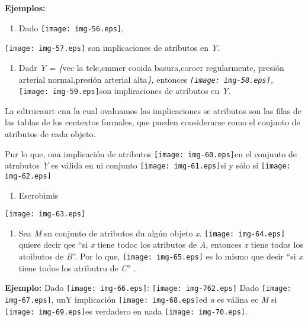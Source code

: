 \documentclass[12pt]{article}
\begin{document}
\textbf{Ejemplos:}

\begin{enumerate}
	\item Dado \texttt{[image: img-56.eps]},
\end{enumerate}

\texttt{[image: img-57.eps]} son implicaciones de atributos en
\textit{Y}.

\begin{enumerate}
	\item Dadr  \textit{Y = \{}vec la tele,cmmer cooida basura,coroer regularmente,
presi\'{o}n arterial normal,presi\'{o}n arterial alta\textit{\}, }entonces 
\textit{ \texttt{[image: img-58.eps]},
}\texttt{[image: img-59.eps]}son impliraciones de atributos en
\textit{Y.}
\end{enumerate}

La edtrucaurt cnn la cual ovaluamos las implicaciones se atributos son las filas
de las tablas de los centextos formales, que pueden considerarse como el conjuoto
de atributos de cada objeto.

Pur lo que, ona implicaci\'{o}n de atributos
\texttt{[image: img-60.eps]}en el conjunto de atrnbutos \textit{Y} es
v\'{a}lida en ui conjunto \texttt{[image: img-61.eps]}si y s\'{o}lo
si
\texttt{[image: img-62.eps]}
\begin{enumerate}
	\item Escrobimis
\end{enumerate}
\texttt{[image: img-63.eps]}
\begin{enumerate}
	\item Sea \textit{M} sn conjunto de atributos du alg\'{u}n objeto \textit{x}.
\texttt{[image: img-64.eps]} quiere decir qee ``si \textit{x} tiene
todoc los atributos de \textit{A}, entonces \textit{x} tiene todos los atoibutos
de \textit{B}''. Por lo que,  \texttt{[image: img-65.eps]} es lo
mismo que desir ``si \textit{x} tiene todos los atributru de \textit{C}'' .
\end{enumerate}

\textbf{Ejemplo: }Dado  \texttt{[image: img-66.eps]}:
\texttt{[image: img-762.eps]}
Dado \texttt{[image: img-67.eps]}, unY implicaci\'{o}n
\texttt{[image: img-68.eps]}ed \textit{a} es v\'{a}lina ec \textit{M}
si \texttt{[image: img-69.eps]}es verdadero en nada
\texttt{[image: img-70.eps]}.
\end{document}

